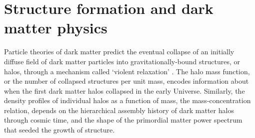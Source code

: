 \section{Structure formation and dark matter physics}
\indent Particle theories of dark matter predict the eventual collapse of an initially diffuse field of dark matter particles into gravitationally-bound structures, or halos, through a mechanism called `violent relaxation' \cite{LyndenBell67}. The halo mass function, or the number of collapsed structures per unit mass, encodes information about when the first dark matter halos collapsed in the early Universe. Similarly, the density profiles of individual halos as a function of mass, the mass-concentration relation, depends on the hierarchical assembly history of dark matter halos through cosmic time, and the shape of the primordial matter power spectrum that seeded the growth of structure. 

